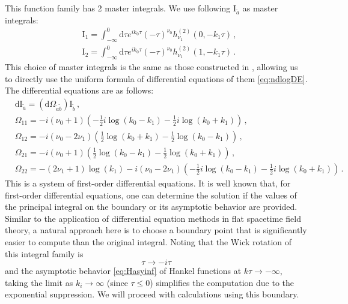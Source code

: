\documentclass[a4paper,11pt]{article}
\newcommand{\nn}{\nonumber}
\newcommand{\nd}{\mathrm{d}}
\begin{document}
This function family has 2 master integrals. We use following $\text{I}_{\tilde{a}}$ as master integrals:
\begin{align}
&\text{I}_{1}=\int_{-\infty}^0 \nd \tau e^{ i k_0 \tau} (-\tau)^{\nu_0} h^{(2)}_{\nu_1}(0,-k_1\tau) \,,\nn\\ 
&\text{I}_{2}=\int_{-\infty}^0 \nd \tau e^{ i k_0 \tau} (-\tau)^{\nu_0} h^{(2)}_{\nu_1}(1,-k_1\tau)\,.
\end{align}
This choice of master integrals is the same as those constructed in \cite{Chen:2023iix}, allowing us to directly use the uniform formula of differential equations of them \eqref{eq:ndlogDE}. The differential equations are as follows:
\begin{align}
&\nd \text{I}_{\tilde{a}} = \left (\nd \Omega_{\tilde{a}\tilde{b}} \right) \text{I}_{\tilde{b} }  \,,\nn\\
&\Omega_{11}=
 -i \left(\nu _0+1\right) \left(-\frac{1}{2} i \log \left(k_0-k_1\right)-\frac{1}{2} i \log
   \left(k_0+k_1\right)\right)  \,,\nn\\
&\Omega_{12}=-i \left(\nu _0-2 \nu _1\right) \left(\frac{1}{2} \log
   \left(k_0+k_1\right)-\frac{1}{2} \log \left(k_0-k_1\right)\right)   \,, \nn\\
&\Omega_{21}=
 -i \left(\nu _0+1\right) \left(\frac{1}{2} \log \left(k_0-k_1\right)-\frac{1}{2} \log
   \left(k_0+k_1\right)\right)   \,, \nn\\
&\Omega_{22}=-\left(2 \nu _1+1\right) \log \left(k_1\right)-i \left(\nu _0-2 \nu _1\right)
   \left(-\frac{1}{2} i \log \left(k_0-k_1\right)-\frac{1}{2} i \log \left(k_0+k_1\right)\right)   \,.  \label{eq:dlogDE1V1f}
\end{align}
This is a system of first-order differential equations. It is well known that, for first-order differential equations, one can determine the solution if the values of the principal integral on the boundary or its asymptotic behavior are provided. Similar to the application of differential equation methods in flat spacetime field theory, a natural approach here is to choose a boundary point that is significantly easier to compute than the original integral. Noting that the Wick rotation of this integral family is 
\begin{equation}
\tau \to - i \tau
\end{equation} 
and the asymptotic behavior \eqref{eq:Hasyinf} of Hankel functions at $k\tau\to -\infty$, taking the limit as $k_i\to \infty$ (since $\tau \leq 0$) simplifies the computation due to the exponential suppression. We will proceed with calculations using this boundary.
\end{document}
